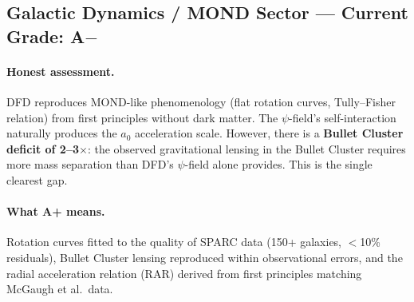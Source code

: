 \documentclass[11pt,a4paper]{article}
\begin{document}
\subsection{Galactic Dynamics / MOND Sector --- Current Grade: A$-$}

\paragraph{Honest assessment.}
DFD reproduces MOND-like phenomenology (flat rotation curves, Tully--Fisher relation) from first principles without dark matter. The $\psi$-field's self-interaction naturally produces the $a_0$ acceleration scale. However, there is a \textbf{Bullet Cluster deficit of 2--3$\times$}: the observed gravitational lensing in the Bullet Cluster requires more mass separation than DFD's $\psi$-field alone provides. This is the single clearest gap.

\paragraph{What A+ means.}
Rotation curves fitted to the quality of SPARC data (150+ galaxies, $<$10\% residuals), Bullet Cluster lensing reproduced within observational errors, and the radial acceleration relation (RAR) derived from first principles matching McGaugh et al.\ data.
\end{document}
